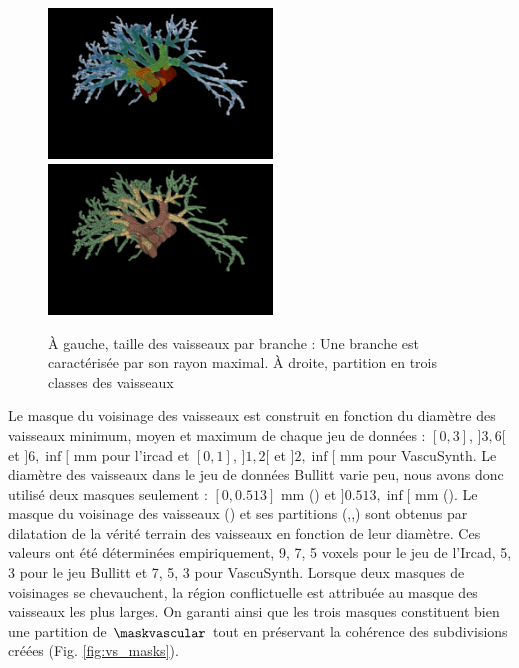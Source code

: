 \begin{figure}[h]
  \centering
  \includegraphics[height=4cm]{Images/vs_labels.png}
  \includegraphics[height=4cm]{Images/vs_labelMask.png}
  \caption{À gauche, taille des vaisseaux par branche : Une branche est caractérisée par son rayon maximal. À droite, partition en trois classes des vaisseaux }
  \label{fig:vessels_partition}
\end{figure}

Le masque du voisinage des vaisseaux est construit en fonction du diamètre des vaisseaux minimum, moyen et maximum de chaque jeu de données : $[0,3]$, $]3,6[$ et $]6,\inf[$ mm pour l'ircad et $[0,1]$, $]1,2[$ et $]2,\inf[$ mm pour VascuSynth. Le diamètre des vaisseaux dans le jeu de données Bullitt varie peu, nous avons donc utilisé deux masques seulement : $[0,0.513]$ mm (\maskvesselSmall) et $]0.513,\inf[$ mm (\maskvesselMedium). Le masque du voisinage des vaisseaux (\maskvessel) et ses partitions (\maskvesselLarge,\maskvesselMedium,\maskvesselSmall) sont obtenus par dilatation de la vérité terrain des vaisseaux en fonction de leur diamètre. Ces valeurs ont été déterminées empiriquement, 9, 7, 5 voxels pour le jeu de l'Ircad, 5, 3 pour le jeu Bullitt et 7, 5, 3 pour VascuSynth. Lorsque deux masques de voisinages se chevauchent, la région conflictuelle est attribuée au masque des vaisseaux les plus larges. On garanti ainsi que les trois masques constituent bien une partition de $\maskvascular$ tout en préservant la cohérence des subdivisions créées (Fig. \ref{fig:vs_masks}).

